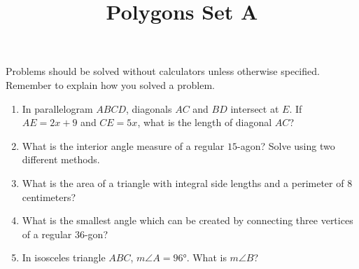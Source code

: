 \documentclass{article}
\title{Polygons Set A}
\author{}
\date{}
\begin{document}
\maketitle
\noindent Problems should be solved without calculators unless otherwise specified.
Remember to explain how you solved a problem.
\begin{multicols}{2}
    \begin{enumerate}
        \item In parallelogram $ABCD$, diagonals $AC$ and $BD$ intersect at $E$.
            If $AE = 2x + 9$ and $CE = 5x$, what is the length of diagonal $AC$?
            \vspace{3cm}
        \item What is the interior angle measure of a regular $15$-agon?
            Solve using two different methods.
            \vspace{3cm}
        \item What is the area of a triangle with integral side lengths and a perimeter of $8$ centimeters?
            \vspace{3cm}
        \item What is the smallest angle which can be created by connecting three vertices of a regular $36$-gon?
            \vspace{3cm}
        \item In isosceles triangle $ABC$, $m\angle A = \ang{96}$.
            What is $m\angle B$?
            \vspace{3cm}
    \end{enumerate}
\end{multicols}
\end{document}
